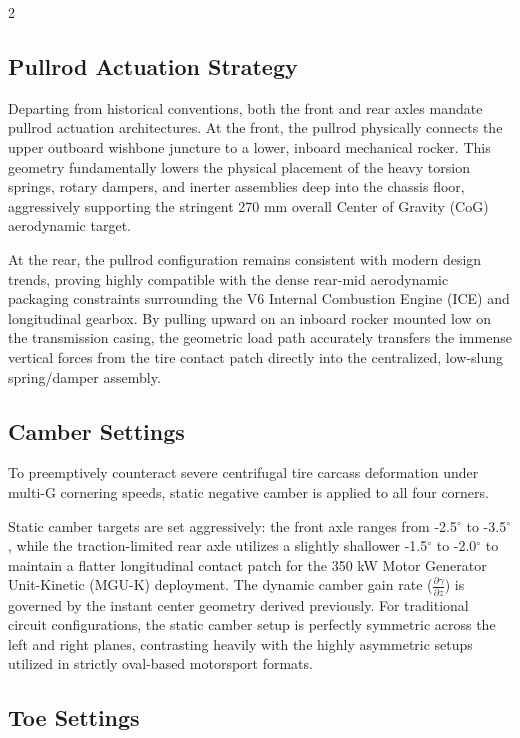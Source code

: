 \begin{multicols}{2}
\subsection{Pullrod Actuation Strategy}

Departing from historical conventions, both the front and rear axles mandate pullrod actuation architectures. At the front, the pullrod physically connects the upper outboard wishbone juncture to a lower, inboard mechanical rocker. This geometry fundamentally lowers the physical placement of the heavy torsion springs, rotary dampers, and inerter assemblies deep into the chassis floor, aggressively supporting the stringent 270 mm overall Center of Gravity (CoG) aerodynamic target.

At the rear, the pullrod configuration remains consistent with modern design trends, proving highly compatible with the dense rear-mid aerodynamic packaging constraints surrounding the V6 Internal Combustion Engine (ICE) and longitudinal gearbox. By pulling upward on an inboard rocker mounted low on the transmission casing, the geometric load path accurately transfers the immense vertical forces from the tire contact patch directly into the centralized, low-slung spring/damper assembly.

\subsection{Camber Settings}

To preemptively counteract severe centrifugal tire carcass deformation under multi-G cornering speeds, static negative camber is applied to all four corners. 

Static camber targets are set aggressively: the front axle ranges from -2.5$^\circ$ to -3.5$^\circ$, while the traction-limited rear axle utilizes a slightly shallower -1.5$^\circ$ to -2.0$^\circ$ to maintain a flatter longitudinal contact patch for the 350 kW Motor Generator Unit-Kinetic (MGU-K) deployment. The dynamic camber gain rate ($\frac{\partial\gamma}{\partial z}$) is governed by the instant center geometry derived previously. For traditional circuit configurations, the static camber setup is perfectly symmetric across the left and right planes, contrasting heavily with the highly asymmetric setups utilized in strictly oval-based motorsport formats.

\subsection{Toe Settings}


\end{multicols}
